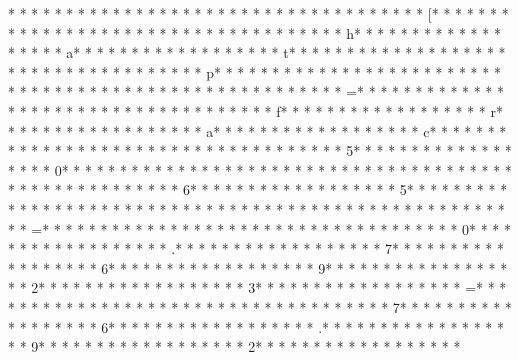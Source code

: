* * *  * * *  * * *  *  * * *  *  * * *  * 
* * *  * * *  * * *  *  * * *  *  * * *  * [* * *  * * *  * * *  *  * * *  *  * * *  *  * * *  * * *  * * *  *  * * *  *  * * *  * h* * *  * * *  * * *  *  * * *  *  * * *  * a* * *  * * *  * * *  *  * * *  *  * * *  * t* * *  * * *  * * *  *  * * *  *  * * *  * {* * *  * * *  * * *  *  * * *  *  * * *  * p* * *  * * *  * * *  *  * * *  *  * * *  * }* * *  * * *  * * *  *  * * *  *  * * *  *  * * *  * * *  * * *  *  * * *  *  * * *  * =* * *  * * *  * * *  *  * * *  *  * * *  *  * * *  * * *  * * *  *  * * *  *  * * *  * f* * *  * * *  * * *  *  * * *  *  * * *  * r* * *  * * *  * * *  *  * * *  *  * * *  * a* * *  * * *  * * *  *  * * *  *  * * *  * c* * *  * * *  * * *  *  * * *  *  * * *  * {* * *  * * *  * * *  *  * * *  *  * * *  * 5* * *  * * *  * * *  *  * * *  *  * * *  * 0* * *  * * *  * * *  *  * * *  *  * * *  * }* * *  * * *  * * *  *  * * *  *  * * *  * {* * *  * * *  * * *  *  * * *  *  * * *  * 6* * *  * * *  * * *  *  * * *  *  * * *  * 5* * *  * * *  * * *  *  * * *  *  * * *  * }* * *  * * *  * * *  *  * * *  *  * * *  *  * * *  * * *  * * *  *  * * *  *  * * *  * =* * *  * * *  * * *  *  * * *  *  * * *  *  * * *  * * *  * * *  *  * * *  *  * * *  * 0* * *  * * *  * * *  *  * * *  *  * * *  * .* * *  * * *  * * *  *  * * *  *  * * *  * 7* * *  * * *  * * *  *  * * *  *  * * *  * 6* * *  * * *  * * *  *  * * *  *  * * *  * 9* * *  * * *  * * *  *  * * *  *  * * *  * 2* * *  * * *  * * *  *  * * *  *  * * *  * 3* * *  * * *  * * *  *  * * *  *  * * *  * =* * *  * * *  * * *  *  * * *  *  * * *  *  * * *  * * *  * * *  *  * * *  *  * * *  * 7* * *  * * *  * * *  *  * * *  *  * * *  * 6* * *  * * *  * * *  *  * * *  *  * * *  * .* * *  * * *  * * *  *  * * *  *  * * *  * 9* * *  * * *  * * *  *  * * *  *  * * *  * 2* * *  * * *  * * *  *  * * *  *  * * *  * %
